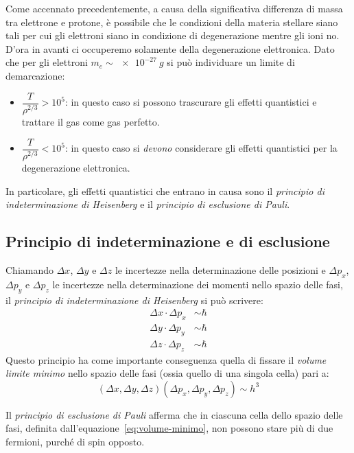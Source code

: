 Come accennato precedentemente, a causa della significativa differenza di massa tra elettrone e protone, è possibile che le condizioni della materia stellare siano tali per cui gli elettroni siano in condizione di degenerazione mentre gli ioni no. D'ora in avanti ci occuperemo solamente della degenerazione elettronica. Dato che per gli elettroni $m_e \sim \SI{e-27}{g}$ si può individuare un limite di demarcazione:
\begin{itemize}
    \item $\dfrac{T}{\rho^{2/3}} > 10^5$: in questo caso si possono trascurare gli effetti quantistici e trattare il gas come gas perfetto.
    \item $\dfrac{T}{\rho^{2/3}} < 10^5$: in questo caso si \emph{devono} considerare gli effetti quantistici per la degenerazione elettronica.
\end{itemize}

In particolare, gli effetti quantistici che entrano in causa sono il \emph{principio di indeterminazione di Heisenberg} e il \emph{principio di esclusione di Pauli}.

\subsection{Principio di indeterminazione e di esclusione}\label{sec:principio-indeterminazione}
Chiamando $\Delta x$, $\Delta y$ e $\Delta z$ le incertezze nella determinazione delle posizioni e $\Delta p_x$, $\Delta p_y$ e $\Delta p_z$ le incertezze nella determinazione dei momenti nello spazio delle fasi, il \emph{principio di indeterminazione di Heisenberg} si può scrivere:
\begin{subequations}
\label{eq:principio-indeterminazione}
\begin{align}
\Delta x \cdot \Delta p_x &\sim \hbar \\
\Delta y \cdot \Delta p_y &\sim \hbar \\
\Delta z \cdot \Delta p_z &\sim \hbar 
\end{align}
\end{subequations}
Questo principio ha come importante conseguenza quella di fissare il \emph{volume limite minimo} nello spazio delle fasi (ossia quello di una singola cella) pari a:
\begin{equation}\label{eq:volume-minimo}
(\Delta x, \Delta y,\Delta z) (\Delta p_x, \Delta p_y, \Delta p_z) \sim h^3
\end{equation}

Il \emph{principio di esclusione di Pauli} afferma che in ciascuna cella dello spazio delle fasi, definita dall'equazione~\eqref{eq:volume-minimo}, non possono stare più di due fermioni, purché di spin opposto.

